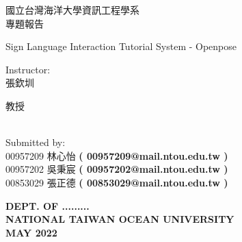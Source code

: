 \documentclass[12pt,a4paper]{report}
\begin{document}
\begin{CJK*}{UTF8}{bkai}
    \begin{center}
        \begin{LARGE}
            國立台灣海洋大學資訊工程學系\\
            專題報告\\
        \end{LARGE}
        \vspace{0.5cm}

        \begin{LARGE}
            Sign Language Interaction Tutorial System - Openpose\\
        \end{LARGE}
        \vspace{1cm}
        Instructor:\\
        張欽圳
        \begin{scriptsize}
            教授
        \end{scriptsize}
        \\
        \vspace{1 cm}
        Submitted by: \\

        00957209 林心怡
        \textbf{ ( 00957209@mail.ntou.edu.tw ) }\\
        00957202 吳秉宸
        \textbf{ ( 00957202@mail.ntou.edu.tw ) }\\

        00853029 張正德
        \textbf{ ( 00853029@mail.ntou.edu.tw ) }\\
        \vspace{0.2cm}

    \end{center}

    \begin{center}
        \textbf{DEPT. OF .........}\\

        \textbf{NATIONAL TAIWAN OCEAN UNIVERSITY}\\
        \vspace{12pt}
        \textbf{MAY 2022}\\
    \end{center}
    \thispagestyle{empty}

    \newpage




\end{CJK*}
\end{document}
